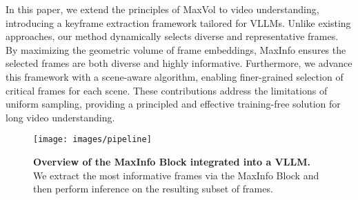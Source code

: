 In this paper, we extend the principles of MaxVol to video understanding, introducing a keyframe extraction framework tailored for VLLMs. Unlike existing approaches, our method dynamically selects diverse and representative frames. By maximizing the geometric volume of frame embeddings, MaxInfo ensures the selected frames are both diverse and highly informative. Furthermore, we advance this framework with a scene-aware algorithm, enabling finer-grained selection of critical frames for each scene. These contributions address the limitations of uniform sampling, providing a principled and effective training-free solution for long video understanding.

\begin{figure*}[ht]
\vskip 0.2in
\begin{center}
\centerline{\texttt{[image: images/pipeline]}}
\caption{\textbf{Overview of the MaxInfo Block integrated into a VLLM.} We extract the most informative frames via the MaxInfo Block and then perform inference on the resulting subset of frames.}
\label{pipeline}
\end{center}
\vskip -0.2in
\end{figure*}